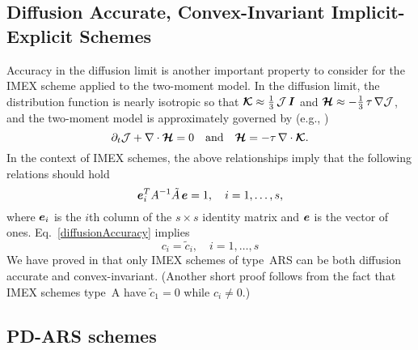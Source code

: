 \subsection{Diffusion Accurate, Convex-Invariant Implicit-Explicit Schemes}

Accuracy in the diffusion limit is another important property to consider for the IMEX scheme applied to the two-moment model.  
In the diffusion limit, the distribution function is nearly isotropic so that $\boldsymbol{\mathcal{K}}\approx\frac{1}{3}\,\mathcal{J}\,\boldsymbol{I}$ and $\boldsymbol{\mathcal{H}}\approx-\frac{1}{3}\,\tau\,\nabla\mathcal{J}$, and the two-moment model is approximately governed by (e.g., \cite{jinLevermore_1996})
\begin{equation}
  \partial_{t}{\mathcal{J}} + \nabla\cdot\boldsymbol{\mathcal{H}} = 0
  \quad\text{and}\quad
  \boldsymbol{\mathcal{H}} = - \tau\,\nabla\cdot\boldsymbol{\mathcal{K}}.  
  \label{eq:diffusionLimit}
\end{equation}
In the context of IMEX schemes, the above relationships imply that the following relations should hold
\begin{equation}
   \boldsymbol{e}_{i}^{T}A^{-1}\tilde{A}\,\boldsymbol{e} = 1, \quad i=1,\ldots,s,
   \label{diffusionAccuracy}
\end{equation}
where $\boldsymbol{e}_{i}$ is the $i$th column of the $s\times s$ identity matrix and $\boldsymbol{e}$ is the vector of ones.
Eq.~\eqref{diffusionAccuracy} implies
\begin{equation}
  c_{i} = \tilde{c}_{i}, \quad i=1,\ldots,s
\end{equation}
We have proved in \cite{chu_etal_2018} that only IMEX schemes of type~ARS can be both diffusion accurate and convex-invariant.  
(Another short proof follows from the fact that IMEX schemes type~A have $\tilde{c}_1 = 0$ while $c_i \neq 0$.)  

\subsection{PD-ARS schemes}

